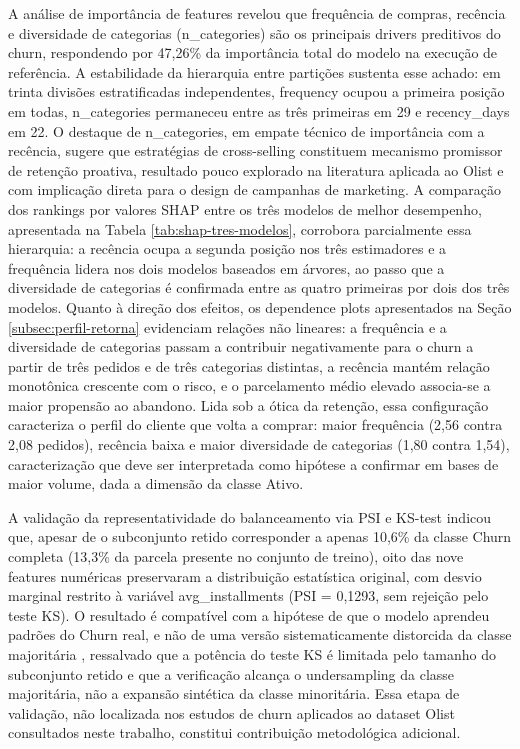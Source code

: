 A análise de importância de features revelou que frequência de compras, recência e diversidade de categorias (n\_categories) são os principais drivers preditivos do churn, respondendo por 47,26\% da importância total do modelo na execução de referência. A estabilidade da hierarquia entre partições sustenta esse achado: em trinta divisões estratificadas independentes, frequency ocupou a primeira posição em todas, n\_categories permaneceu entre as três primeiras em 29 e recency\_days em 22. O destaque de n\_categories, em empate técnico de importância com a recência, sugere que estratégias de cross-selling constituem mecanismo promissor de retenção proativa, resultado pouco explorado na literatura aplicada ao Olist e com implicação direta para o design de campanhas de marketing. A comparação dos rankings por valores SHAP entre os três modelos de melhor desempenho, apresentada na Tabela \ref{tab:shap-tres-modelos}, corrobora parcialmente essa hierarquia: a recência ocupa a segunda posição nos três estimadores e a frequência lidera nos dois modelos baseados em árvores, ao passo que a diversidade de categorias é confirmada entre as quatro primeiras por dois dos três modelos. Quanto à direção dos efeitos, os dependence plots apresentados na Seção \ref{subsec:perfil-retorna} evidenciam relações não lineares: a frequência e a diversidade de categorias passam a contribuir negativamente para o churn a partir de três pedidos e de três categorias distintas, a recência mantém relação monotônica crescente com o risco, e o parcelamento médio elevado associa-se a maior propensão ao abandono. Lida sob a ótica da retenção, essa configuração caracteriza o perfil do cliente que volta a comprar: maior frequência (2,56 contra 2,08 pedidos), recência baixa e maior diversidade de categorias (1,80 contra 1,54), caracterização que deve ser interpretada como hipótese a confirmar em bases de maior volume, dada a dimensão da classe Ativo.

A validação da representatividade do balanceamento via PSI e KS-test indicou que, apesar de o subconjunto retido corresponder a apenas 10,6\% da classe Churn completa (13,3\% da parcela presente no conjunto de treino), oito das nove features numéricas preservaram a distribuição estatística original, com desvio marginal restrito à variável avg\_installments (PSI = 0,1293, sem rejeição pelo teste KS). O resultado é compatível com a hipótese de que o modelo aprendeu padrões do Churn real, e não de uma versão sistematicamente distorcida da classe majoritária \cite{he2009}, ressalvado que a potência do teste KS é limitada pelo tamanho do subconjunto retido e que a verificação alcança o undersampling da classe majoritária, não a expansão sintética da classe minoritária. Essa etapa de validação, não localizada nos estudos de churn aplicados ao dataset Olist consultados neste trabalho, constitui contribuição metodológica adicional.

